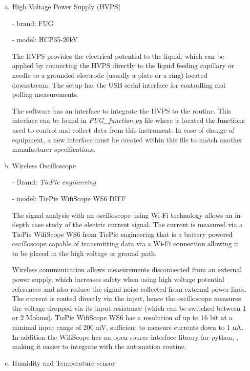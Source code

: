 \begin{enumerate}[a)]

  \item High Voltage Power Supply (HVPS)
  
     - brand: FUG
    
     - model: HCP35-20kV
    
    The HVPS provides the electrical potential to the liquid, which can be applied by connecting the HVPS directly to the liquid feeding capillary or needle to a grounded electrode (usually a plate or a ring) located downstream.\cite{Monica}
    The setup has the USB serial interface for controlling and polling measurements.
    
    The software has an interface to integrate the HVPS to the routine. This interface can be found in \emph{FUG\_function.py} file where is located the functions used to control and collect data from this instrument.
    In case of change of equipment, a new interface must be created within this file to match another manufacturer specifications.

  \item Wireless Oscilloscope
  
     - Brand: \emph{TiePie engineering}

     - model: TiePie WifiScope WS6 DIFF
    
    The signal analysis with an oscilloscope using Wi-Fi technology allows an in-depth case study of the electric current signal.
    The current is measured via a TiePie WifiScope WS6 from TiePie engineering that is a battery powered oscilloscope capable of transmitting data via a Wi-Fi connection allowing it to be placed in the high voltage or ground path.
    
    Wireless communication allows measurements disconnected from an external power supply, which increases safety when using high voltage potential references and also reduce the signal noise collected from external power lines.
    The current is routed directly via the input, hence the oscilloscope measures the voltage dropped via its input resistance (which can be switched between 1 or 2 Mohms).
    TiePie WifiScope WS6 has a resolution of up to 16 bit at a minimal input range of 200 mV, sufficient to measure currents down to 1 nA. In addition the WifiScope has an open source interface library for python, \cite{TiePieLib}, making it easier to integrate with the automation routine.

  \item Humidity and Temperature sensor
  

\end{enumerate}
